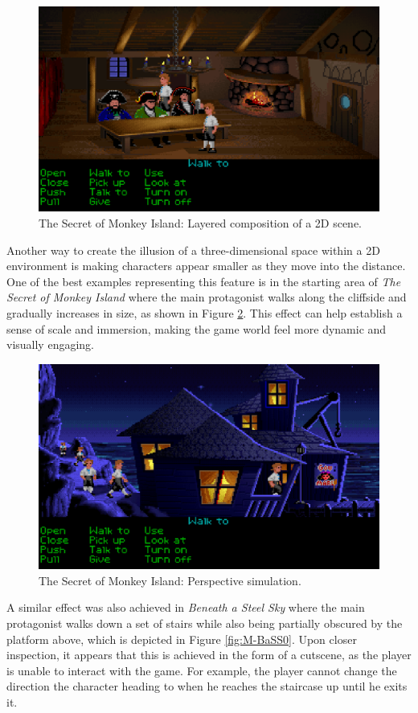 \begin{figure}[H]
\centering
\includegraphics[width=.8\linewidth]{img/M-TSoMI0.png}
\caption{The Secret of Monkey Island: Layered composition of a 2D scene.}
\label{fig:M-TSoMI0}
\end{figure}

Another way to create the illusion of a three-dimensional space within a 2D environment is making characters appear smaller as they move into the distance. One of the best examples representing this feature is in the starting area of \textit{The Secret of Monkey Island} where the main protagonist walks along the cliffside and gradually increases in size, as shown in Figure \ref{fig:M-TSoMI}. This effect can help establish a sense of scale and immersion, making the game world feel more dynamic and visually engaging. 

\begin{figure}[H]
\centering
\includegraphics[width=.8\linewidth]{img/M-TSoMI.png}
\caption{The Secret of Monkey Island: Perspective simulation.}
\label{fig:M-TSoMI}
\end{figure}

A similar effect was also achieved in \textit{Beneath a Steel Sky} where the main protagonist walks down a set of stairs while also being partially obscured by the platform above, which is depicted in Figure \ref{fig:M-BaSS0}. Upon closer inspection, it appears that this is achieved in the form of a cutscene, as the player is unable to interact with the game. For example, the player cannot change the direction the character heading to when he reaches the staircase up until he exits it. 

